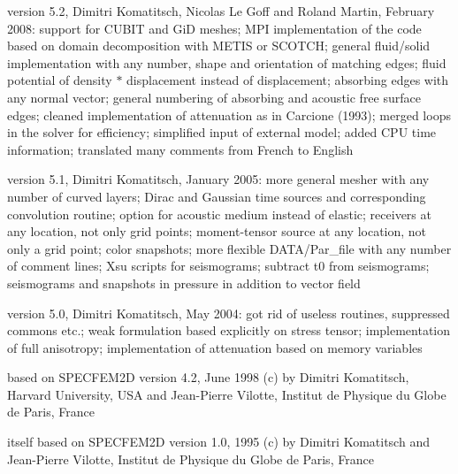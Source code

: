 version 5.2, Dimitri Komatitsch, Nicolas Le Goff and Roland Martin, February 2008:\newline
support for CUBIT and GiD meshes;
MPI implementation of the code based on domain decomposition with METIS or SCOTCH;
general fluid/solid implementation with any number, shape and orientation of matching edges;
fluid potential of density $*$ displacement instead of displacement;
absorbing edges with any normal vector;
general numbering of absorbing and acoustic free surface edges;
cleaned implementation of attenuation as in Carcione (1993);
merged loops in the solver for efficiency;
simplified input of external model;
added CPU time information;
translated many comments from French to English\newline

version 5.1, Dimitri Komatitsch, January 2005:\newline
more general mesher with any number of curved layers;
Dirac and Gaussian time sources and corresponding convolution routine;
option for acoustic medium instead of elastic;
receivers at any location, not only grid points;
moment-tensor source at any location, not only a grid point;
color snapshots;
more flexible DATA/Par\_file with any number of comment lines;
Xsu scripts for seismograms;
subtract t0 from seismograms;
seismograms and snapshots in pressure in addition to vector field\newline

version 5.0, Dimitri Komatitsch, May 2004:\newline
got rid of useless routines, suppressed commons etc.;
weak formulation based explicitly on stress tensor;
implementation of full anisotropy;
implementation of attenuation based on memory variables\newline

based on SPECFEM2D version 4.2, June 1998\newline
(c) by Dimitri Komatitsch, Harvard University, USA
and Jean-Pierre Vilotte, Institut de Physique du Globe de Paris, France

itself based on SPECFEM2D version 1.0, 1995\newline
(c) by Dimitri Komatitsch and Jean-Pierre Vilotte,
Institut de Physique du Globe de Paris, France


